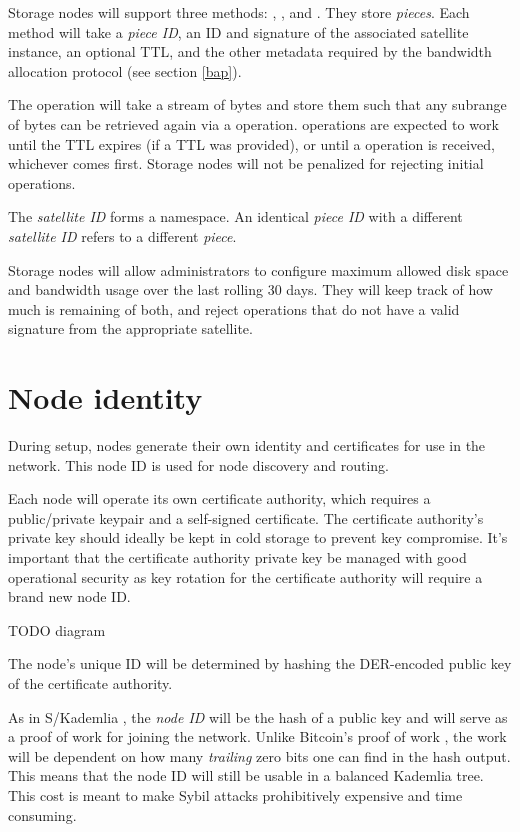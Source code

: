 \documentclass[11pt,fleqn,openany]{book}
\newcommand{\todo}[1]{{\color{red} TODO #1 }}
\begin{document}
Storage nodes will support three methods: , , and
. They store {\em pieces}.
Each method will take a {\em piece ID}, an ID and signature of the associated
satellite instance, an optional TTL, and the other metadata required by the
bandwidth allocation protocol (see section \ref{bap}).

The  operation will take a stream of bytes and store them such
that any subrange of bytes can be retrieved again via a  operation.
 operations are expected to work until the TTL expires (if a TTL was
provided), or until a  operation is received, whichever comes
first.
Storage
nodes will not be penalized for rejecting initial  operations.

The {\em satellite ID} forms a namespace. An identical {\em piece ID} with a
different {\em satellite ID} refers to a different {\em piece}.

Storage nodes will allow administrators to configure maximum allowed disk
space and bandwidth usage over the last rolling 30 days.
They will keep track of how much is remaining of both, and reject operations
that do not have a valid signature from the appropriate satellite.

\section{Node identity}

During setup, nodes generate their own identity and certificates for use in
the network.
This node ID is used for node discovery and routing.

Each node will operate its own certificate authority, which requires a
public/private keypair and a self-signed certificate. The certificate
authority's private key should ideally be kept in cold storage to prevent key
compromise.
It's important that the certificate authority private key be managed with good
operational security as key rotation for the certificate authority will require
a brand new node ID.

\todo{diagram}

The node's unique ID will be determined by hashing the DER-encoded public key
of the certificate authority.

As in S/Kademlia \cite{skad}, the {\em node ID} will be the hash of a public key
and will serve as a proof of work for joining the network. Unlike Bitcoin's
proof of work \cite{bitcoin}, the work will be dependent on how many
{\em trailing}
zero bits one can find in the hash output. This means that the node ID will
still be usable in a balanced Kademlia \cite{kad} tree.
This cost is meant to make Sybil attacks prohibitively expensive and time
consuming.
\end{document}
